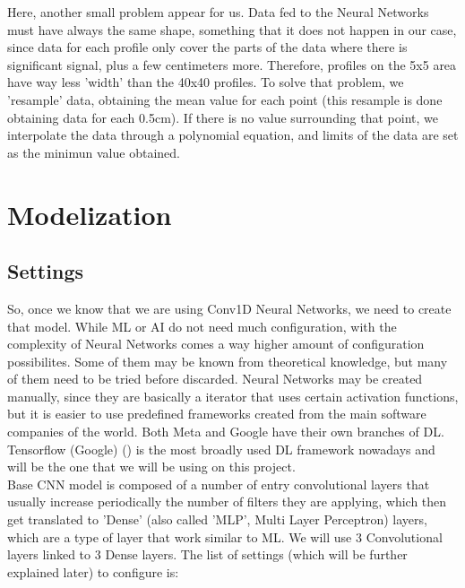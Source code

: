 \documentclass[openany]{article}
\begin{document}
Here, another small problem appear for us. Data fed to the Neural Networks must have always the same shape, something that it does not happen in our case, since data for each profile only cover the parts of the data where there is significant signal, plus a few centimeters more. Therefore, profiles on the 5x5 area have way less 'width' than the 40x40 profiles. To solve that problem, we 'resample' data, obtaining the mean value for each point (this resample is done obtaining data for each 0.5cm). If there is no value surrounding that point, we interpolate the data through a polynomial equation, and limits of the data are set as the minimun value obtained.




\newpage

\section{Modelization}

\subsection{Settings}

So, once we know that we are using Conv1D Neural Networks, we need to create that model. While ML or AI do not need much configuration, with the complexity of Neural Networks comes a way higher amount of configuration possibilites. Some of them may be known from theoretical knowledge, but many of them need to be tried before discarded. Neural Networks may be created manually, since they are basically a iterator that uses certain activation functions, but it is easier to use predefined frameworks created from the main software companies of the world. Both Meta and Google have their own branches of DL. Tensorflow (Google) (\cite{45381}) is the most broadly used DL framework nowadays and will be the one that we will be using on this project. \\

Base CNN model is composed of a number of entry convolutional layers that usually increase periodically the number of filters they are applying, which then get translated to 'Dense' (also called 'MLP', Multi Layer Perceptron) layers, which are a type of layer that work similar to ML. We will use 3 Convolutional layers linked to 3 Dense layers. The list of settings (which will be further explained later) to configure is:
\end{document}
